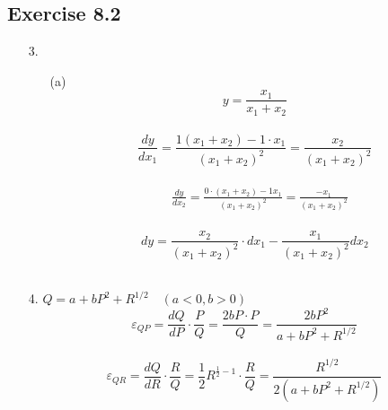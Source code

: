 \documentclass{./../../Latex/homework}
\begin{document}
\subsection*{Exercise 8.2} 
\begin{enumerate}

\item[3.]
\begin{enumerate}
\item[(a)] $$y=\frac{x_{1}}{x_{1}+x_{2}}$$ \\
$$
\frac{d y}{d x_{1}}=\frac{1\left(x_{1}+x_{2}\right)-1 \cdot x_{1}}{\left(x_{1}+x_{2}\right)^{2}}=\frac{x_{2}}{\left(x_{1}+x_{2}\right)^{2}}
$$ \\
$$
\begin{aligned}
& \frac{d y}{d x_{2}}=\frac{0 \cdot\left(x_{1}+x_{2}\right)-1 x_{1}}{\left(x_{1}+x_{2}\right)^{2}}=\frac{-x_{1}}{\left(x_{1}+x_{2}\right)^{2}}
\end{aligned}
$$ \\
$$
d y=\frac{x_{2}}{\left(x_{1}+x_{2}\right)^{2}} \cdot d x_{1}-\frac{x_{1}}{\left(x_{1}+x_{2}\right)^{2}} d x_{2}
$$ \\
\end{enumerate}

\item[4.] $Q=a+b P^{2}+R^{1 / 2} \quad(a<0, b>0)$ \\
$$
\varepsilon_{Q P}=\frac{d Q}{d P} \cdot \frac{P}{Q}=\frac{2 b P \cdot P}{Q}=\frac{2 b P^{2}}{a+b P^{2}+R^{1 / 2}}
$$ \\
$$
\varepsilon_{Q R}=\frac{d Q}{d R} \cdot \frac{R}{Q}=\frac{1}{2} R^{\frac{1}{2}-1} \cdot \frac{R}{Q}=\frac{R^{1 / 2}}{2\left(a+b P^{2}+R^{1 / 2}\right)}
$$ \\


\end{enumerate}
\end{document}
